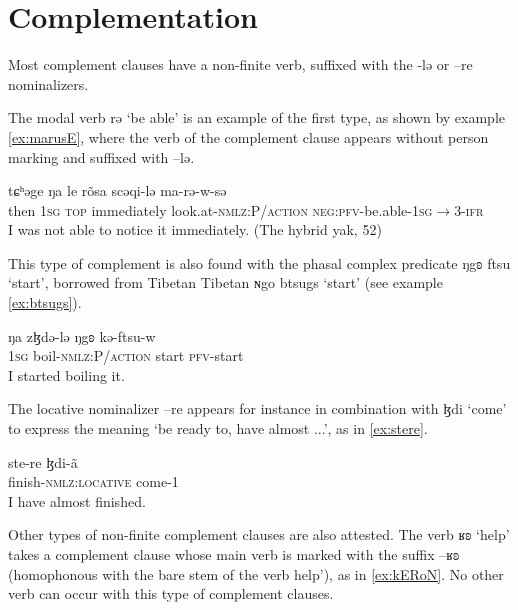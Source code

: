 \documentclass[oneside,a4paper,11pt]{article}
\newcommand{\ipa}[1]{{\phon #1}} %
\begin{document}
 
 

\section{Complementation}  
Most complement clauses have a non-finite verb, suffixed with the \ipa{-lə} or \ipa{--re} nominalizers.

The modal verb \ipa{rə} `be able' is an example of the first type, as shown by example \ref{ex:marusE}, where the verb of the complement clause appears without person marking and suffixed with \ipa{--lə}.

\begin{exe}
\ex\label{ex:marusE}
\gll
\ipa{tɕʰəge} 	\ipa{ŋa} 	\ipa{le} 	\ipa{rõsa} 	\ipa{scəqi-lə} 	\ipa{ma-rə-w-sə} \\
then \textsc{1sg} \textsc{top} immediately look.at-\textsc{nmlz:P/action} \textsc{neg:pfv}-be.able-\textsc{1sg}$\rightarrow$3-\textsc{ifr} \\
\glt I was not able to notice it immediately. (The hybrid yak, 52)
\end{exe}

This type of complement is also found with the phasal complex predicate \ipa{ŋgʚ} \ipa{ftsu} `start', borrowed from Tibetan Tibetan \ipa{ɴgo btsugs} `start' (see example \ref{ex:btsugs}).

\begin{exe}
\ex \label{ex:btsugs}
\gll 
\ipa{ŋa} 	\ipa{zɮdə-lə} 	\ipa{ŋgʚ} 	\ipa{kə-ftsu-w} \\
\textsc{1sg} boil-\textsc{nmlz:P/action} start \textsc{pfv}-start \\
\glt I started boiling it.
\end{exe}

The locative nominalizer \ipa{--re} appears for instance in combination with \ipa{ɮdi} `come' to express the meaning `be ready to, have almost ...', as in \ref{ex:stere}.

\begin{exe}
\ex \label{ex:stere}
\gll 
 \ipa{ste-re} 	\ipa{ɮdi-ã} \\
finish-\textsc{nmlz:locative} come-1 \\
\glt I have almost finished.
\end{exe}



Other types of non-finite complement clauses are also attested. The verb \ipa{ʁʚ}  `help' takes a complement clause  whose main verb is marked with the suffix \ipa{--ʁʚ} (homophonous with the bare stem of the verb  help'), as in \ref{ex:kERoN}. No other verb can occur with this type of complement clauses.
\end{document}
